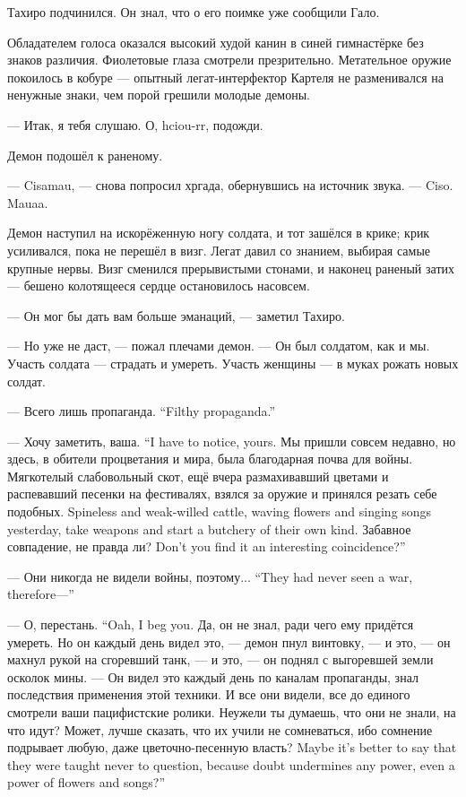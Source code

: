 Тахиро подчинился.
Он знал, что о его поимке уже сообщили Гало.

Обладателем голоса оказался высокий худой канин в синей гимнастёрке без знаков различия.
Фиолетовые глаза смотрели презрительно.
Метательное оружие покоилось в кобуре --- опытный легат-интерфектор Картеля не разменивался на ненужные знаки, чем порой грешили молодые демоны.

--- Итак, я тебя слушаю.
О, hciou-rr\FM, подожди.

Демон подошёл к раненому.

--- Cisamau, --- снова попросил хргада, обернувшись на источник звука.
--- Ciso. Mauaa.

Демон наступил на искорёженную ногу солдата, и тот зашёлся в крике;
крик усиливался, пока не перешёл в визг.
Легат давил со знанием, выбирая самые крупные нервы.
Визг сменился прерывистыми стонами, и наконец раненый затих --- бешено колотящееся сердце остановилось насовсем.

--- Он мог бы дать вам больше эманаций, --- заметил Тахиро.

--- Но уже не даст, --- пожал плечами демон.
--- Он был солдатом, как и мы.
Участь солдата --- страдать и умереть.
Участь женщины --- в муках рожать новых солдат.

{--- Всего лишь пропаганда.}
{``Filthy propaganda.''}

{--- Хочу заметить, ваша.}
{``I have to notice, yours.}
Мы пришли совсем недавно, но здесь, в обители процветания и мира, была благодарная почва для войны.
{Мягкотелый слабовольный скот, ещё вчера размахивавший цветами и распевавший песенки на фестивалях, взялся за оружие и принялся резать себе подобных.}
{Spineless and weak-willed cattle, waving flowers and singing songs yesterday, take weapons and start a butchery of their own kind.}
{Забавное совпадение, не правда ли?}
{Don't you find it an interesting coincidence?''}

{--- Они никогда не видели войны, поэтому...}
{``They had never seen a war, therefore---''}

{--- О, перестань.}
{``Oah, I beg you.}
Да, он не знал, ради чего ему придётся умереть.
Но он каждый день видел это, --- демон пнул винтовку, --- и это, --- он махнул рукой на сгоревший танк, --- и это, --- он поднял с выгоревшей земли осколок мины.
--- Он видел это каждый день по каналам пропаганды, знал последствия применения этой техники.
И все они видели, все до единого смотрели ваши пацифистские ролики.
Неужели ты думаешь, что они не знали, на что идут?
{Может, лучше сказать, что их учили не сомневаться, ибо сомнение подрывает любую, даже цветочно-песенную власть?}
{Maybe it's better to say that they were taught never to question, because doubt undermines any power, even a power of flowers and songs?''}

